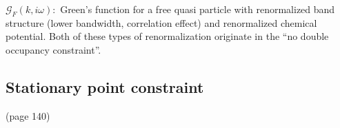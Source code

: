 \(\mathcal{G}_F(k, i\omega):\) Green's function for a free quasi particle with renormalized band structure (lower bandwidth, correlation effect) and renormalized chemical potential. Both of these types of renormalization originate in the ``no double occupancy constraint''.

\subsection{Stationary point constraint}
(page 140)



